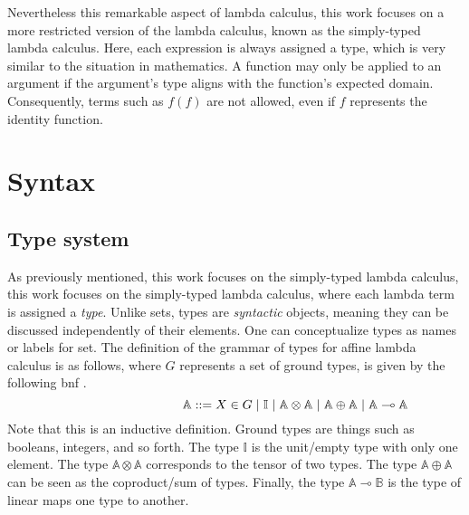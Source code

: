 Nevertheless this remarkable aspect of lambda calculus, this work focuses on a more restricted version of the lambda calculus, known as the simply-typed lambda calculus. Here, each expression is always assigned a type, which is very similar to the situation in mathematics. A function may only be applied to an argument if the argument's type aligns with the function's expected domain. Consequently, terms such as $f(f)$ are not allowed, even if $f$ represents the identity function.






\section{Syntax}

\subsection{Type system}

As previously mentioned, this work focuses on the simply-typed lambda calculus, this work focuses on the simply-typed lambda calculus, where each lambda term is assigned a \emph{type}. Unlike sets, types are \emph{syntactic} objects, meaning they can be discussed independently of their elements. One can conceptualize types as names or labels for set. The definition of the grammar of types for affine lambda calculus is as follows, where $G$ represents a set of ground types, is given by the following \acrfull{bnf} \cite{backus1960report}.
\begin{equation} \label{eq:grammartypes}
\centering
\hspace{95pt} \mathbb{A} ::= X \in G \hspace{3 pt} \vert \hspace{3 pt} \mathbb{I}  \hspace{3 pt}  \vert \hspace{3 pt} \mathbb{A}  \otimes  \mathbb{A} \hspace{3 pt}  \vert \hspace{3 pt} \mathbb{A}  \oplus  \mathbb{A} \hspace{3 pt} \vert  \hspace{3 pt}  \mathbb{A} \multimap  \mathbb{A}
\end{equation}
Note that this is an inductive definition. Ground types are things such as booleans, integers, and so forth. The type $\mathbb{I}$ is the unit/empty type with only one element. The type $\mathbb{A} \otimes \mathbb{A}$ corresponds to the tensor of two types. The type $\mathbb{A} \oplus \mathbb{A}$ can be seen as the coproduct/sum of types. Finally, the type $\mathbb{A} \multimap \mathbb{B}$ is the type of linear maps one type to another.


